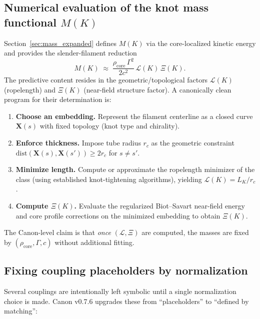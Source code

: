 \documentclass[10pt]{article}
\newcommand{\rhocore}{\rho_{\text{core}}}
\begin{document}
\subsection{Numerical evaluation of the knot mass functional $M(K)$}
\label{sec:mass_numerics_program}

Section~\ref{sec:mass_expanded} defines $M(K)$ via the core-localized kinetic energy
and provides the slender-filament reduction
\begin{equation}
M(K)\;\approx\;\frac{\rhocore\,\Gamma^2}{2c^2}\,\mathcal{L}(K)\,\Xi(K).
\end{equation}
The predictive content resides in the geometric/topological factors
$\mathcal{L}(K)$ (ropelength) and $\Xi(K)$ (near-field structure factor). A
canonically clean program for their determination is:

\begin{enumerate}
\item \textbf{Choose an embedding.} Represent the filament centerline as a closed curve
$\mathbf{X}(s)$ with fixed topology (knot type and chirality).
\item \textbf{Enforce thickness.} Impose tube radius $r_c$ as the geometric constraint
$\mathrm{dist}(\mathbf{X}(s),\mathbf{X}(s'))\ge 2r_c$ for $s\neq s'$.
\item \textbf{Minimize length.} Compute or approximate the ropelength minimizer of the class
(using established knot-tightening algorithms), yielding $\mathcal{L}(K)=L_K/r_c$.
\item \textbf{Compute $\Xi(K)$.} Evaluate the regularized Biot--Savart near-field energy and
core profile corrections on the minimized embedding to obtain $\Xi(K)$.
\end{enumerate}

The Canon-level claim is that \emph{once} $(\mathcal{L},\Xi)$ are computed, the masses
are fixed by $(\rhocore,\Gamma,c)$ without additional fitting.

\subsection{Fixing coupling placeholders by normalization}
\label{sec:coupling_normalization}

Several couplings are intentionally left symbolic until a single normalization
choice is made. Canon v0.7.6 upgrades these from ``placeholders'' to ``defined by
matching'':
\end{document}
